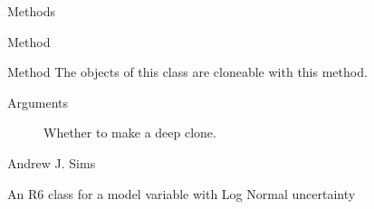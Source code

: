 \documentclass[a4paper]{book}
\begin{document}
\begin{Section}{Methods}
\begin{SubSection}{Method }
\end{SubSection}



\hypertarget{method-clone}{}
%
\begin{SubSection}{Method }
The objects of this class are cloneable with this method.
%


%
\begin{SubSubSection}{Arguments}

\begin{description}

\item[] Whether to make a deep clone.

\end{description}


\end{SubSubSection}

\end{SubSection}

\end{Section}
%
\begin{Author}\relax
Andrew J. Sims 
\end{Author}
%
\begin{Description}\relax
An R6 class for a model variable with Log Normal uncertainty
\end{Description}
%
\end{document}

